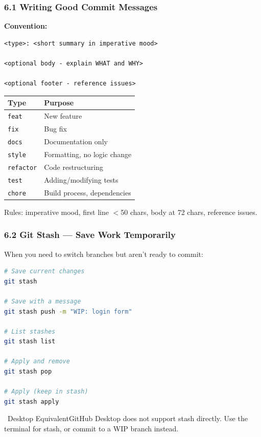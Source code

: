 \documentclass{beamer}
\newcommand{\desktoptip}[1]{\begin{block}{\faMousePointer\ Desktop Equivalent}#1\end{block}}
\begin{document}
\begin{frame}[fragile]
\frametitle{6.1 Writing Good Commit Messages}

\textbf{Convention:}
\begin{lstlisting}
<type>: <short summary in imperative mood>

<optional body - explain WHAT and WHY>

<optional footer - reference issues>
\end{lstlisting}

\vspace{2mm}
\begin{table}[h]
\centering
\scriptsize
\begin{tabular}{ll}
\toprule
\textbf{Type} & \textbf{Purpose} \\
\midrule
\texttt{feat} & New feature \\
\texttt{fix} & Bug fix \\
\texttt{docs} & Documentation only \\
\texttt{style} & Formatting, no logic change \\
\texttt{refactor} & Code restructuring \\
\texttt{test} & Adding/modifying tests \\
\texttt{chore} & Build process, dependencies \\
\bottomrule
\end{tabular}
\end{table}

\vspace{2mm}
\small Rules: imperative mood, first line $<$50 chars, body at 72 chars, reference issues.
\end{frame}

\begin{frame}[fragile]
\frametitle{6.2 Git Stash --- Save Work Temporarily}

When you need to switch branches but aren't ready to commit:
\begin{lstlisting}[language=bash]
# Save current changes
git stash

# Save with a message
git stash push -m "WIP: login form"

# List stashes
git stash list

# Apply and remove
git stash pop

# Apply (keep in stash)
git stash apply
\end{lstlisting}

\desktoptip{GitHub Desktop does not support stash directly. Use the terminal for stash, or commit to a WIP branch instead.}
\end{frame}
\end{document}
